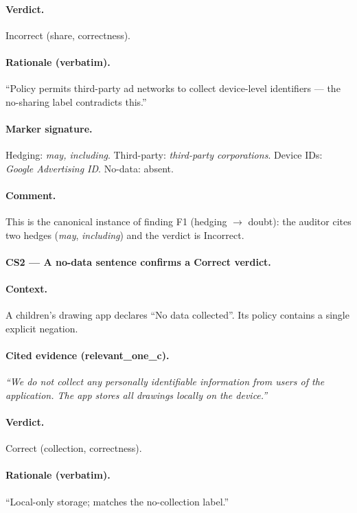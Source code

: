 \documentclass[11pt,a4paper]{article}
\newcommand{\dec}[1]{\textsf{#1}}
\begin{document}
\paragraph{Verdict.} Incorrect (share, correctness).
\paragraph{Rationale (verbatim).} ``Policy permits third-party ad
networks to collect device-level identifiers --- the no-sharing label
contradicts this.''
\paragraph{Marker signature.}
\dec{Hedging}: \emph{may, including}.
\dec{Third-party}: \emph{third-party corporations}.
\dec{Device IDs}: \emph{Google Advertising ID}.
\dec{No-data}: absent.
\paragraph{Comment.} This is the canonical instance of finding F1
(hedging $\to$ doubt): the auditor cites two hedges (\emph{may},
\emph{including}) and the verdict is Incorrect.

\paragraph{CS2 --- A no-data sentence confirms a Correct verdict.}
\paragraph{Context.}
A children's drawing app declares ``No data collected''. Its policy
contains a single explicit negation.
\paragraph{Cited evidence (relevant\_one\_c).}
\textit{``We do not collect any personally identifiable information from
users of the application. The app stores all drawings locally on the
device.''}
\paragraph{Verdict.} Correct (collection, correctness).
\paragraph{Rationale (verbatim).} ``Local-only storage; matches the
no-collection label.''
\end{document}
